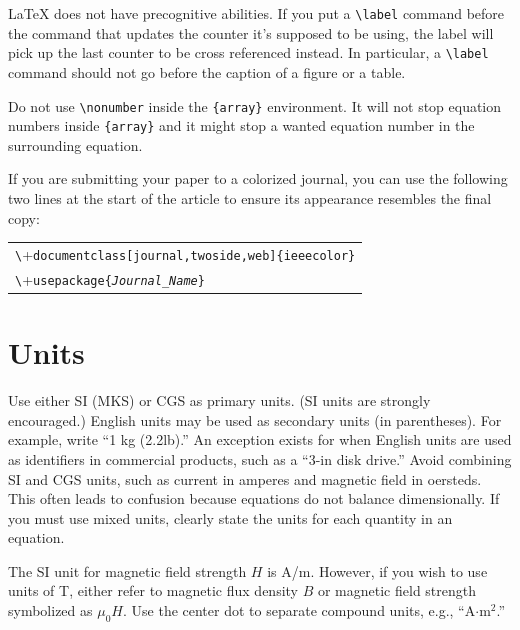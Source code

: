 \documentclass[journal,twoside,web]{ieeecolor}
\begin{document}
{\LaTeX} does not have precognitive abilities. If you put a
\verb|\label| command before the command that updates the counter it's
supposed to be using, the label will pick up the last counter to be
cross referenced instead. In particular, a \verb|\label| command
should not go before the caption of a figure or a table.

Do not use \verb|\nonumber| inside the \verb|{array}| environment. It
will not stop equation numbers inside \verb|{array}| and it might stop a
wanted equation number in the surrounding equation.

If you are submitting your paper to a colorized journal, you can use
the following two lines at the start of the article to ensure its
appearance resembles the final copy:

\smallskip\noindent
\begin{small}
    \begin{tabular}{l}
        \verb+\+\texttt{documentclass[journal,twoside,web]\{ieeecolor\}} \\
        \verb+\+\texttt{usepackage\{\textit{Journal\_Name}\}}
    \end{tabular}
\end{small}

\section{Units}
Use either SI (MKS) or CGS as primary units. (SI units are strongly
encouraged.) English units may be used as secondary units (in parentheses).
For example, write ``1 kg (2.2lb).'' An exception exists for when
English units are used as identifiers in commercial products, such as a ``3\textonehalf-in
disk drive.'' Avoid combining SI and CGS units, such as current in amperes
and magnetic field in oersteds. This often leads to confusion because
equations do not balance dimensionally. If you must use mixed units, clearly
state the units for each quantity in an equation.

The SI unit for magnetic field strength $H$ is A/m. However, if you wish to use
units of T, either refer to magnetic flux density $B$ or magnetic field
strength symbolized as $\mu _{0}H$. Use the center dot to separate
compound units, e.g., ``A$\cdot $m$^{2}$.''
\end{document}
